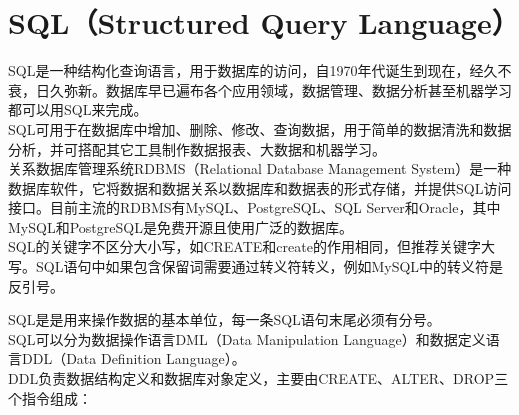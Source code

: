 \documentclass[12pt, openany, oneside]{book}
\begin{document}
\section{SQL（Structured Query Language）}

SQL是一种结构化查询语言，用于数据库的访问，自1970年代诞生到现在，经久不衰，日久弥新。数据库早已遍布各个应用领域，数据管理、数据分析甚至机器学习都可以用SQL来完成。 \\

SQL可用于在数据库中增加、删除、修改、查询数据，用于简单的数据清洗和数据分析，并可搭配其它工具制作数据报表、大数据和机器学习。 \\

关系数据库管理系统RDBMS（Relational Database Management System）是一种数据库软件，它将数据和数据关系以数据库和数据表的形式存储，并提供SQL访问接口。目前主流的RDBMS有MySQL、PostgreSQL、SQL Server和Oracle，其中MySQL和PostgreSQL是免费开源且使用广泛的数据库。 \\

SQL的关键字不区分大小写，如CREATE和create的作用相同，但推荐关键字大写。SQL语句中如果包含保留词需要通过转义符转义，例如MySQL中的转义符是反引号。

SQL是是用来操作数据的基本单位，每一条SQL语句末尾必须有分号。 \\

SQL可以分为数据操作语言DML（Data Manipulation Language）和数据定义语言DDL（Data Definition Language）。 \\

DDL负责数据结构定义和数据库对象定义，主要由CREATE、ALTER、DROP三个指令组成：

\begin{table}[H]
    \centering
    \caption{DDL指令}
\end{table}
\end{document}
